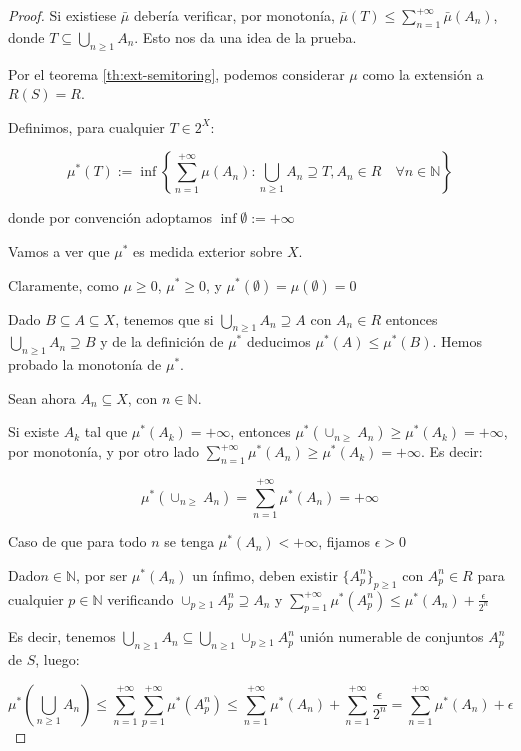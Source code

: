 \begin{proof}
 Si existiese $\bar{\mu}$ debería verificar, por monotonía, $\bar{\mu}(T) \le \sum_{n=1}^{+\infty} \bar{\mu}(A_n)$, 
 donde $T \subseteq \bigcup_{n\ge 1} A_n$. Esto nos da una idea de la prueba.
 
 Por el teorema \ref{th:ext-semitoring}, podemos considerar $\mu$ como la extensión a $R(S)=R$.
 
 Definimos, para cualquier $T\in 2^X$:
 
 \[\mu^\ast(T):= \inf\left\{\sum_{n=1}^{+\infty} \mu(A_n): \bigcup_{n\ge 1} A_n \supseteq T,
                 A_n\in R \quad \forall n\in\mathbb{N}\right\}\]

 donde por convención adoptamos $\inf \emptyset := +\infty$
 
 Vamos a ver que $\mu^\ast$ es medida exterior sobre $X$.
 
 Claramente, como $\mu \ge 0$, $\mu^\ast \ge 0$, y $\mu^\ast(\emptyset) = \mu(\emptyset) = 0$
 
 Dado $B\subseteq A \subseteq X$, tenemos que si $\bigcup_{n\ge 1} A_n \supseteq A$ con $A_n\in R$
 entonces $\bigcup_{n\ge 1} A_n \supseteq B$ y de la definición de $\mu^\ast$ deducimos $\mu^\ast(A) \le \mu^\ast(B)$.
 Hemos probado la monotonía de $\mu^\ast$.
 
 Sean ahora $A_n \subseteq X$, con $n\in \mathbb{N}$.
 
 Si existe $A_k$ tal que $\mu^\ast(A_k) = +\infty$, entonces $\mu^\ast(\cup_{n\ge} A_n) \ge \mu^\ast(A_k) = +\infty$, 
 por monotonía, y por otro lado $\sum_{n=1}^{+\infty} \mu^\ast(A_n) \ge \mu^\ast(A_k) = +\infty$. Es decir:

 \[\mu^\ast(\cup_{n\ge} A_n) = \sum_{n=1}^{+\infty} \mu^\ast(A_n) = +\infty\]
 
 Caso de que para todo $n$ se tenga $\mu^\ast(A_n) < +\infty$, fijamos $\epsilon > 0$
 
 Dado$n\in \mathbb{N}$, por ser $\mu^\ast(A_n)$ un ínfimo, deben existir $\{A_p^n\}_{p\ge 1}$ con 
 $A_p^n \in R$ para cualquier $p\in\mathbb{N}$ verificando $\cup_{p\ge 1} A_p^n \supseteq A_n$ y
 $\sum_{p=1}^{+\infty} \mu^\ast(A_p^n) \le \mu^\ast(A_n) + \frac{\epsilon}{2^n}$
 
 Es decir, tenemos $\bigcup_{n\ge 1} A_n \subseteq \bigcup_{n\ge 1} \cup_{p\ge 1} A_p^n$ unión numerable
 de conjuntos $A_p^n$ de $S$, luego:
 
 \[\mu^\ast \left(\bigcup_{n\ge 1} A_n \right) \le \sum_{n=1}^{+\infty} \sum_{p=1}^{+\infty} \mu^\ast(A_p^n)
   \le \sum_{n=1}^{+\infty}\mu^\ast(A_n) + \sum_{n=1}^{+\infty}\frac{\epsilon}{2^n} = 
   \sum_{n=1}^{+\infty}\mu^\ast(A_n) + \epsilon\]
 

\end{proof}
